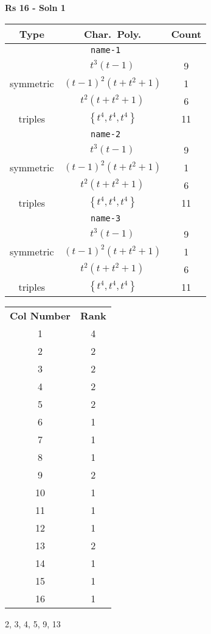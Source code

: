 \documentclass{article}
\begin{document}
    \textbf{Rs 16 - Soln 1}
    \begin{table}
    \begin{tabular}{|c|c|c|}
    \hline
    \textbf{Type} & \textbf{Char.~Poly.} & \textbf{Count} \\
    \hline \multicolumn{3}{|c|}{\texttt{name-1}} \\ \hline
    \multirow{3}{*}{symmetric}
     & $t^3(t - 1)$ & 9 \\
     & $(t - 1)^2(t + t^2 + 1)$ & 1 \\
     & $t^2(t + t^2 + 1)$ & 6 \\
    \hline
    \multirow{1}{*}{triples}
     & $\left\{t^4,t^4,t^4\right\}$ & 11 \\
    \hline \multicolumn{3}{|c|}{\texttt{name-2}} \\ \hline
    \multirow{3}{*}{symmetric}
     & $t^3(t - 1)$ & 9 \\
     & $(t - 1)^2(t + t^2 + 1)$ & 1 \\
     & $t^2(t + t^2 + 1)$ & 6 \\
    \hline
    \multirow{1}{*}{triples}
     & $\left\{t^4,t^4,t^4\right\}$ & 11 \\
    \hline \multicolumn{3}{|c|}{\texttt{name-3}} \\ \hline
    \multirow{3}{*}{symmetric}
     & $t^3(t - 1)$ & 9 \\
     & $(t - 1)^2(t + t^2 + 1)$ & 1 \\
     & $t^2(t + t^2 + 1)$ & 6 \\
    \hline
    \multirow{1}{*}{triples}
     & $\left\{t^4,t^4,t^4\right\}$ & 11 \\
    \hline
    \end{tabular}
    \end{table}
    \begin{table}
    \begin{tabular}{|c|c|}
    \hline
    \textbf{Col Number} & \textbf{Rank}\\
    1 & 4 \\ 
    2 & 2 \\ 
    3 & 2 \\ 
    4 & 2 \\ 
    5 & 2 \\ 
    6 & 1 \\ 
    7 & 1 \\ 
    8 & 1 \\ 
    9 & 2 \\ 
    10 & 1 \\ 
    11 & 1 \\ 
    12 & 1 \\ 
    13 & 2 \\ 
    14 & 1 \\ 
    15 & 1 \\ 
    16 & 1 \\ 
    \hline
    \end{tabular}
    \end{table}

    2, 3, 4, 5, 9, 13
    \newpage
\end{document}
